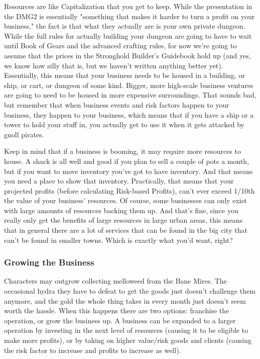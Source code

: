 Resources are like Capitalization that you get to keep. While the presentation in the DMG2 is essentially "something that makes it harder to turn a profit on your business," the fact is that what they actually are is your own private dungeon. While the full rules for actually building your dungeon are going to have to wait until Book of Gears and the advanced crafting rules, for now we're going to assume that the prices in the Stronghold Builder's Guidebook hold up (and yes, we know how silly that is, but we haven't written anything better yet). Essentially, this means that your business needs to be housed in a building, or ship, or cart, or dungeon of some kind. Bigger, more high-scale business ventures are going to need to be housed in more expensive surroundings. That sounds bad, but remember that when business events and risk factors happen to your business, they happen to your business, which means that if you have a ship or a tower to hold your stuff in, you actually get to use it when it gets attacked by gnoll pirates.

Keep in mind that if a business is booming, it may require more resources to house. A shack is all well and good if you plan to sell a couple of pots a month, but if you want to move inventory you've got to have inventory. And that means you need a place to show that inventory. Practically, that means that your projected profits (before calculating Risk-based Profits), can't ever exceed 1/10th the value of your business' resources. Of course, some businesses can only exist with large amounts of resources backing them up. And that's fine, since you really only get the benefits of large resources in large urban areas, this means that in general there are a lot of services that can be found in the big city that can't be found in smaller towns. Which is exactly what you'd want, right?

\subsubsection{Growing the Business}

Characters may outgrow collecting melloweed from the Bane Mires. The occasional hydra they have to defeat to get the goods just doesn't challenge them anymore, and the gold the whole thing takes in every month just doesn't seem worth the hassle. When this happens there are two options: franchise the operation, or grow the business up. A business can be expanded to a larger operation by investing in the next level of resources (causing it to be eligible to make more profits), or by taking on higher value/risk goods and clients (causing the risk factor to increase and profits to increase as well).

